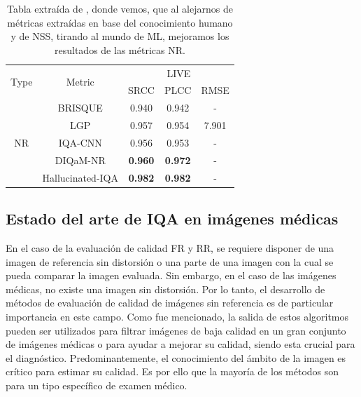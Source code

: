 \begin{table}[htp]
  \tiny
    \centering
    \begin{tabular}{|c|c|c|c|c|}
    \hline 
    \multirow{2}{*}{Type} & \multirow{2}{*}{Metric} & \multicolumn{3}{c|}{LIVE}\\
    \cline{3-5}
                          & & SRCC & PLCC & RMSE \\
    \hline
    \multirow{5}{*}{NR} & 
                           BRISQUE \cite{BRISQUE} & 0.940 & 0.942 & - \\
                          & LGP \cite{LGP} & 0.957 & 0.954 & 7.901 \\
                          & IQA-CNN \cite{IQA-CNN} & 0.956 & 0.953 & - \\
                          & DIQaM-NR \cite{DIQaM} & \textbf{0.960} & \textbf{0.972} & - \\
                          & Hallucinated-IQA \cite{Hallucinated-IQA} & \textbf{0.982} & \textbf{0.982} & - \\
                          \hline
  \end{tabular}
  \caption[Tablas estado del arte NR-IQA]{Tabla extraída de \cite{SurveyOf2D3DMetrics}, donde vemos, 
  que al alejarnos de métricas extraídas en base del conocimiento humano y de NSS, tirando al mundo de ML, mejoramos los resultados de las métricas NR.}
  \label{tab:SOTANRIQA}
\end{table}

\subsection{Estado del arte de IQA en imágenes médicas}

En el caso de la evaluación de calidad FR y RR, se requiere disponer 
de una imagen de referencia sin distorsión o una parte de una imagen con la cual 
se pueda comparar la imagen evaluada. Sin embargo, en el caso de las imágenes médicas, 
no existe una imagen sin distorsión\cite{DicomDistortionsExample}. 
Por lo tanto, el desarrollo de métodos de evaluación de calidad de imágenes 
sin referencia es de particular importancia en este campo\cite{LGP, BRISQUE, IQA-CNN, DIQaM, Hallucinated-IQA}.
Como fue mencionado, la salida de estos algoritmos pueden ser utilizados 
para filtrar imágenes de baja calidad en un gran conjunto de imágenes médicas o 
para ayudar a mejorar su calidad, siendo esta crucial para el diagnóstico\cite{DicomDistortionsExample}.
Predominantemente, el conocimiento del ámbito de la imagen es crítico para estimar 
su calidad. Es por ello que la mayoría de los métodos son para un tipo específico 
de examen médico.

